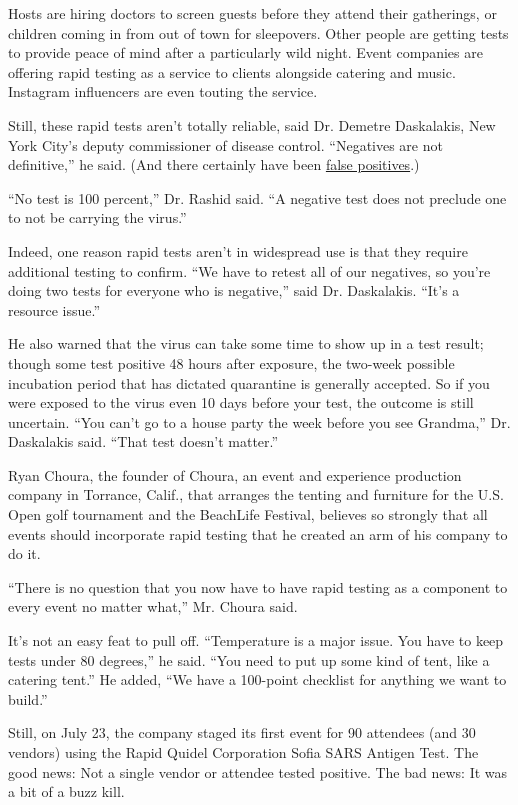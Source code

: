 Hosts are hiring doctors to screen guests before they attend their
gatherings, or children coming in from out of town for sleepovers. Other
people are getting tests to provide peace of mind after a particularly
wild night. Event companies are offering rapid testing as a service to
clients alongside catering and music. Instagram influencers are even
touting the service.

Still, these rapid tests aren't totally reliable, said Dr. Demetre
Daskalakis, New York City's deputy commissioner of disease control.
``Negatives are not definitive,'' he said. (And there certainly have
been
\href{https://www.nytimes3xbfgragh.onion/2020/08/09/health/covid-testing.html}{false
positives}.)

``No test is 100 percent,'' Dr. Rashid said. ``A negative test does not
preclude one to not be carrying the virus.''

Indeed, one reason rapid tests aren't in widespread use is that they
require additional testing to confirm. ``We have to retest all of our
negatives, so you're doing two tests for everyone who is negative,''
said Dr. Daskalakis. ``It's a resource issue.''

He also warned that the virus can take some time to show up in a test
result; though some test positive 48 hours after exposure, the two-week
possible incubation period that has dictated quarantine is generally
accepted. So if you were exposed to the virus even 10 days before your
test, the outcome is still uncertain. ``You can't go to a house party
the week before you see Grandma,'' Dr. Daskalakis said. ``That test
doesn't matter.''

Ryan Choura, the founder of Choura, an event and experience production
company in Torrance, Calif., that arranges the tenting and furniture for
the U.S. Open golf tournament and the BeachLife Festival, believes so
strongly that all events should incorporate rapid testing that he
created an arm of his company to do it.

``There is no question that you now have to have rapid testing as a
component to every event no matter what,'' Mr. Choura said.

It's not an easy feat to pull off. ``Temperature is a major issue. You
have to keep tests under 80 degrees,'' he said. ``You need to put up
some kind of tent, like a catering tent.'' He added, ``We have a
100-point checklist for anything we want to build.''

Still, on July 23, the company staged its first event for 90 attendees
(and 30 vendors) using the Rapid Quidel Corporation Sofia SARS Antigen
Test. The good news: Not a single vendor or attendee tested positive.
The bad news: It was a bit of a buzz kill.

